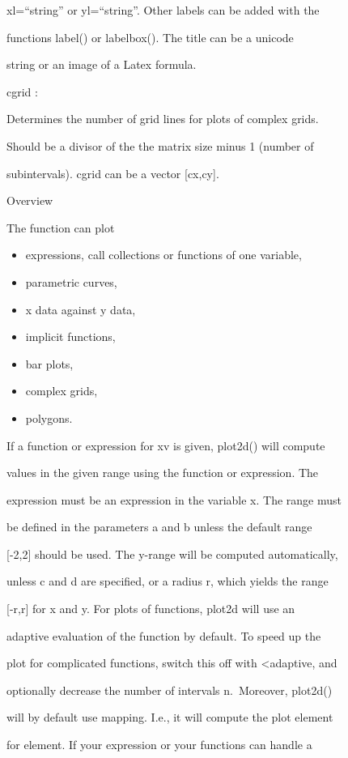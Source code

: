\documentclass[
]{book}
\begin{document}
xl=``string'' or yl=``string''. Other labels can be added with the

functions label() or labelbox(). The title can be a unicode

string or an image of a Latex formula.

cgrid :

Determines the number of grid lines for plots of complex grids.

Should be a divisor of the the matrix size minus 1 (number of

subintervals). cgrid can be a vector {[}cx,cy{]}.

Overview

The function can plot

\begin{itemize}
\item
  expressions, call collections or functions of one variable,
\item
  parametric curves,
\item
  x data against y data,
\item
  implicit functions,
\item
  bar plots,
\item
  complex grids,
\item
  polygons.
\end{itemize}

If a function or expression for xv is given, plot2d() will compute

values in the given range using the function or expression. The

expression must be an expression in the variable x. The range must

be defined in the parameters a and b unless the default range

{[}-2,2{]} should be used. The y-range will be computed automatically,

unless c and d are specified, or a radius r, which yields the range

{[}-r,r{]} for x and y. For plots of functions, plot2d will use an

adaptive evaluation of the function by default. To speed up the

plot for complicated functions, switch this off with \textless adaptive, and

optionally decrease the number of intervals n.~Moreover, plot2d()

will by default use mapping. I.e., it will compute the plot element

for element. If your expression or your functions can handle a
\end{document}

